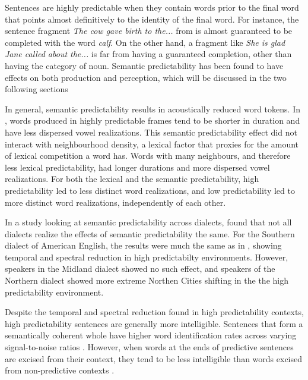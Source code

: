 Sentences are highly predictable when they contain words prior to the final word that points almost definitively to the identity of the final word.  
For instance, the sentence fragment \emph{The cow gave birth to the...} from \citet{Kalikow1977} is almost guaranteed to be completed with the word \emph{calf}.  
On the other hand, a fragment like \emph{She is glad Jane called about the...} is far from having a guaranteed completion, other than having the category of noun. 
Semantic predictability has been found to have effects on both production and perception, which will be discussed in the two following sections

In general, semantic predictability results in acoustically reduced word tokens.  
In \citet{Scarborough2010}, words produced in highly predictable frames tend to be shorter in duration and have less dispersed vowel realizations.  
This semantic predictability effect did not interact with neighbourhood density, a lexical factor that proxies for the amount of lexical competition a word has.  
Words with many neighbours, and therefore less lexical predictability, had longer durations and more dispersed vowel realizations.  
For both the lexical and the semantic predictability, high predictability led to less distinct word realizations, and low predictability led to more distinct word realizations, independently of each other.

In a study looking at semantic predictability across dialects, \citet{Clopper2008} found that not all dialects realize the effects of semantic predictability the same.  
For the Southern dialect of American English, the results were much the same as in \citet{Scarborough2010}, showing temporal and spectral reduction in high predictabilty environments.  
However, speakers in the Midland dialect showed no such effect, and speakers of the Northern dialect showed more extreme Northen Cities shifting in the the high predictability environment.

Despite the temporal and spectral reduction found in high predictability contexts, high predictability sentences are generally more intelligible.  
Sentences that form a semantically coherent whole have higher word identification rates across varying signal-to-noise ratios \citep{Kalikow1977}.  
However, when words at the ends of predictive sentences are excised from their context, they tend to be less intelligible than words excised from non-predictive contexts \citep{Lieberman1963}.

